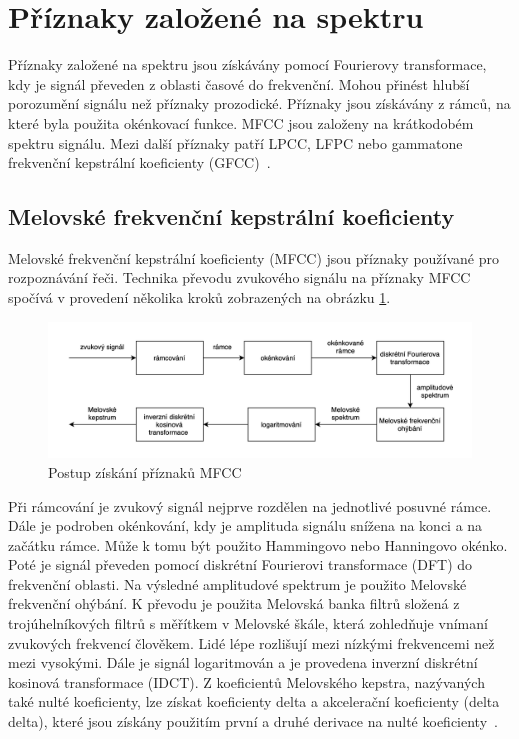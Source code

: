 \documentclass[FM,BP]{tulthesis}
\begin{document}
\section{Příznaky založené na spektru}  %
Příznaky založené na spektru jsou získávány pomocí Fourierovy transformace, kdy je signál převeden z oblasti časové do frekvenční. Mohou přinést hlubší porozumění signálu než příznaky prozodické. Příznaky jsou získávány z rámců, na které byla použita okénkovací funkce. MFCC jsou založeny na krátkodobém spektru signálu. Mezi další příznaky patří LPCC, LFPC nebo gammatone frekvenční kepstrální koeficienty (GFCC)~\cite{DBLP:journals/speech/AkcayO20}.

\subsection{Melovské frekvenční kepstrální koeficienty} %
Melovské frekvenční kepstrální koeficienty (MFCC) jsou příznaky používané pro rozpoznávání řeči. Technika převodu zvukového signálu na příznaky MFCC spočívá v provedení několika kroků zobrazených na obrázku \ref{fig:mfcc_pipeline}. 

\begin{figure}[htbp]
\centerline{\includegraphics[width=\textwidth,height=\textheight,keepaspectratio]{mfcc_pipeline.png}}
\caption{Postup získání příznaků MFCC}
\label{fig:mfcc_pipeline}
\end{figure}
\FloatBarrier

Při rámcování je zvukový signál nejprve rozdělen na jednotlivé posuvné rámce. Dále je podroben okénkování, kdy je amplituda signálu snížena na konci a na začátku rámce. Může k tomu být použito Hammingovo nebo Hanningovo okénko. Poté je signál převeden pomocí diskrétní Fourierovi transformace (DFT) do frekvenční oblasti. Na výsledné amplitudové spektrum je použito Melovské frekvenční ohýbání. K převodu je použita Melovská banka filtrů složená z trojúhelníkových filtrů s měřítkem v Melovské škále, která zohledňuje vnímaní zvukových frekvencí člověkem. Lidé lépe rozlišují mezi nízkými frekvencemi než mezi vysokými. Dále je signál logaritmován a je provedena inverzní diskrétní kosinová transformace (IDCT). Z koeficientů Melovského kepstra, nazývaných také nulté koeficienty, lze získat koeficienty delta a akcelerační koeficienty (delta delta), které jsou získány použitím první a druhé derivace na nulté koeficienty~\cite{mfcc}.
\end{document}

